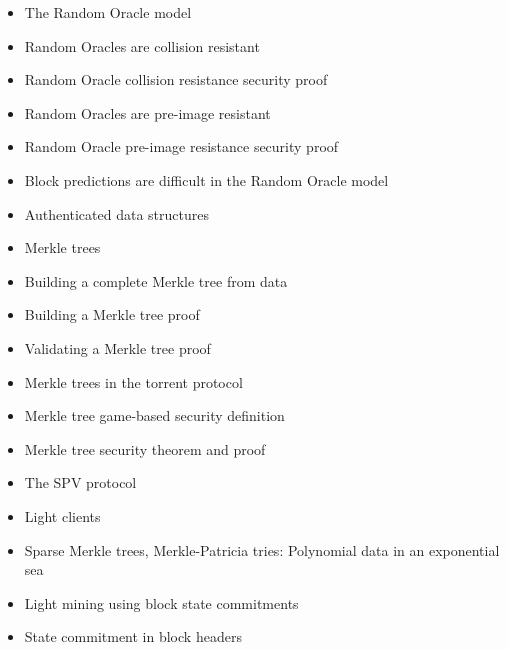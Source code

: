 {\color{red}
\begin{itemize}
\item The Random Oracle model
\item Random Oracles are collision resistant
\item Random Oracle collision resistance security proof
\item Random Oracles are pre-image resistant
\item Random Oracle pre-image resistance security proof
\item Block predictions are difficult in the Random Oracle model
\item Authenticated data structures
\item Merkle trees
\item Building a complete Merkle tree from data
\item Building a Merkle tree proof
\item Validating a Merkle tree proof
\item Merkle trees in the torrent protocol
\item Merkle tree game-based security definition
\item Merkle tree security theorem and proof
\item The SPV protocol
\item Light clients
\item Sparse Merkle trees, Merkle-Patricia tries: Polynomial data in an exponential sea
\item Light mining using block state commitments
\item State commitment in block headers
\end{itemize}
}
